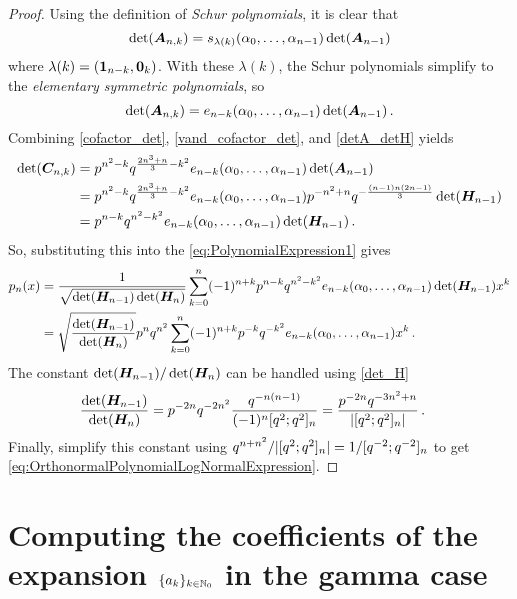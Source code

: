 \begin{subappendices}
\begin{proof}
Using the definition of \emph{Schur polynomials}, it is clear that
\[ \det(\bm{A}_{n,k})  = s_{\lambda(k)}(\alpha_0,\dots,\alpha_{n-1}) \det(\bm{A}_{n-1}) \]
where $\lambda(k) = (\bm{1}_{n-k}, \bm{0}_{k})$. With these $\lambda(k)$, the Schur polynomials simplify to the \emph{elementary symmetric polynomials}, so
\begin{equation} \label{vand_cofactor_det}
\det(\bm{A}_{n,k}) = e_{n-k}(\alpha_0,\dots,\alpha_{n-1}) \det(\bm{A}_{n-1}) \,.
\end{equation}
Combining \eqref{cofactor_det}, \eqref{vand_cofactor_det}, and \eqref{detA_detH} yields
\begin{align*}
\det(\bm{C}_{n,k})
&= p^{n^{2}-k}q^{\frac{2n^{3}+n}{3}-k^{2}} e_{n-k}(\alpha_0,\dots,\alpha_{n-1}) \det(\bm{A}_{n-1}) \\
&=  p^{n^{2}-k}q^{\frac{2n^{3}+n}{3}-k^{2}} e_{n-k}(\alpha_0,\dots,\alpha_{n-1}) p^{-n^2+n} q^{-\frac{(n-1)n(2n-1)}{3}} \det(\bm{H}_{n-1}) \\
&= p^{n-k} q^{n^2-k^2} e_{n-k}(\alpha_0,\dots,\alpha_{n-1}) \det(\bm{H}_{n-1}) \,.
\end{align*}
So, substituting this into the \eqref{eq:PolynomialExpression1} gives
\begin{align*}
p_{n}(x)
&=\frac{1}{\sqrt{\det(\bm{H}_{n-1})\det(\bm{H}_n)}}\sum_{k=0}^{n}(-1)^{n+k} p^{n-k} q^{n^2-k^2} e_{n-k}(\alpha_0,\dots,\alpha_{n-1}) \det(\bm{H}_{n-1}) x^{k} \\
&=  \sqrt{ \frac{ \det(\bm{H}_{n-1}) }{ \det(\bm{H}_n) } } p^{n} q^{n^2} \sum_{k=0}^{n}(-1)^{n+k} p^{-k} q^{-k^2} e_{n-k}(\alpha_0,\dots,\alpha_{n-1})  x^{k} \,.
\end{align*}
The constant $\det(\bm{H}_{n-1}) / \det(\bm{H}_n)$ can be handled using \eqref{det_H}
\begin{align*}
\frac{\det(\bm{H}_{n-1})}{\det(\bm{H}_n)}
&= p^{-2n} q^{-2n^2} \frac{ q^{-n(n-1)} }{ (-1)^n [q^2; q^2]_n  } =  \frac{ p^{-2n} q^{-3n^2+n} }{\lvert  [q^2; q^2]_n \rvert } \,.
\end{align*}
Finally, simplify this constant using $q^{n + n^2}/ \lvert  [q^2; q^2]_n \rvert = 1/[q^{-2}; q^{-2}]_n$ to get \eqref{eq:OrthonormalPolynomialLogNormalExpression}.
\end{proof}

\section{Computing the coefficients of the expansion $\{a_{k}\}_{k\in\mathbb{N}_0}$
in the gamma case} \label{app:proof}


\end{subappendices}
